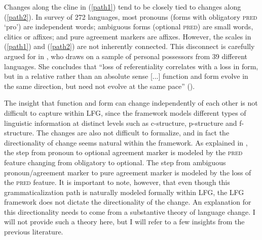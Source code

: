 \documentclass[output=paper,hidelinks]{langscibook}
\begin{document}
   

     
Changes along the cline in (\ref{path1}) tend to be closely tied to changes along (\ref{path2}).  In    survey of 272 languages, most pronouns (forms with obligatory \textsc{pred} `pro') are independent words; ambiguous forms (optional \textsc{pred}) are small words, clitics or affixes; and  pure agreement markers are affixes.    However,  the  scales in  (\ref{path1})  and  (\ref{path2})  are not inherently connected.   This  disconnect is  carefully argued for  in  \citet{rijn2016},  who draws on a sample of  personal possessors from 39 different languages.   She concludes that ``loss of referentiality correlates with a loss in form, but in a relative rather than an absolute sense [...] function and form evolve in the same direction, but need not evolve at the same pace'' (\citeyear[233]{rijn2016}). 

The insight that function and form can change independently of each other is not difficult to capture within LFG, since the framework models different types of linguistic information at distinct levels such as c-structure, p-structure and f-structure.  The changes are also not difficult to formalize,   and in fact the  directionality of change seems natural within the framework.  As explained   in \citet{BM87}, the step from pronoun to optional agreement marker is modeled by the \textsc{pred} feature changing from obligatory to optional.  The step from ambiguous pronoun/agreement marker to pure agreement marker is modeled by the loss of the \textsc{pred} feature. It is important to note, however, that even though this grammaticalization path is naturally modeled formally within LFG, the LFG framework does not dictate   the directionality of the change. An explanation for this directionality needs to come from a substantive theory of language change. I will not provide such a theory here, but I will refer to  a few insights  from the previous  literature. 
\end{document}
